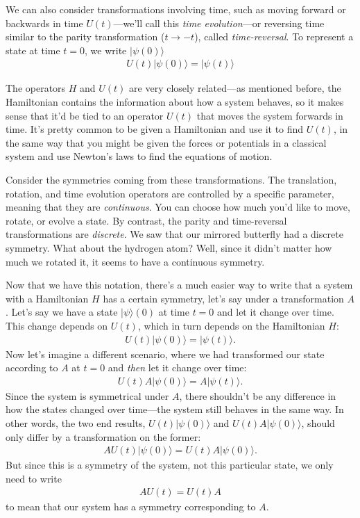 We can also consider transformations involving time, such as moving forward or backwards in time $U(t)$---we'll call this \emph{time evolution}---or reversing time similar to the parity transformation ($t \rightarrow -t$), called \emph{time-reversal}. To represent a state at time $t=0$, we write $|\psi(0)\rangle$
\begin{align*}
    U(t)|\psi(0)\rangle = |\psi(t)\rangle
\end{align*}

The operators $H$ and $U(t)$ are very closely related---as mentioned before, the Hamiltonian contains the information about how a system behaves, so it makes sense that it'd be tied to an operator $U(t)$ that moves the system forwards in time. It's pretty common to be given a Hamiltonian and use it to find $U(t)$, in the same way that you might be given the forces or potentials in a classical system and use Newton's laws to find the equations of motion.

Consider the symmetries coming from these transformations. The translation, rotation, and time evolution operators are controlled by a specific parameter, meaning that they are \emph{continuous}. You can choose how much you'd like to move, rotate, or evolve a state. By contrast, the parity and time-reversal transformations are \emph{discrete}. We saw that our mirrored butterfly had a discrete symmetry. What about the hydrogen atom? Well, since it didn't matter how much we rotated it, it seems to have a continuous symmetry.

Now that we have this notation, there's a much easier way to write that a system with a Hamiltonian $H$ has a certain symmetry, let's say under a transformation $A$. Let's say we have a state $|\psi\rangle(0)$ at time $t=0$ and let it change over time. This change depends on $U(t)$, which in turn depends on the Hamiltonian $H$:
\begin{align*}
    U(t)|\psi(0)\rangle = |\psi(t)\rangle.
\end{align*}
Now let's imagine a different scenario, where we had transformed our state according to $A$ at $t=0$ and \emph{then} let it change over time:
\begin{align*}
    U(t)A|\psi(0)\rangle = A|\psi(t)\rangle.
\end{align*}
Since the system is symmetrical under $A$, there shouldn't be any difference in how the states changed over time---the system still behaves in the same way. In other words, the two end results, $U(t)|\psi(0)\rangle$ and $U(t)A|\psi(0)\rangle$, should only differ by a transformation on the former:
\begin{align*}
    AU(t)|\psi(0)\rangle = U(t)A|\psi(0)\rangle.
\end{align*}
But since this is a symmetry of the system, not this particular state, we only need to write
\begin{align*}
    AU(t) = U(t)A
\end{align*}
to mean that our system has a symmetry corresponding to $A$.

